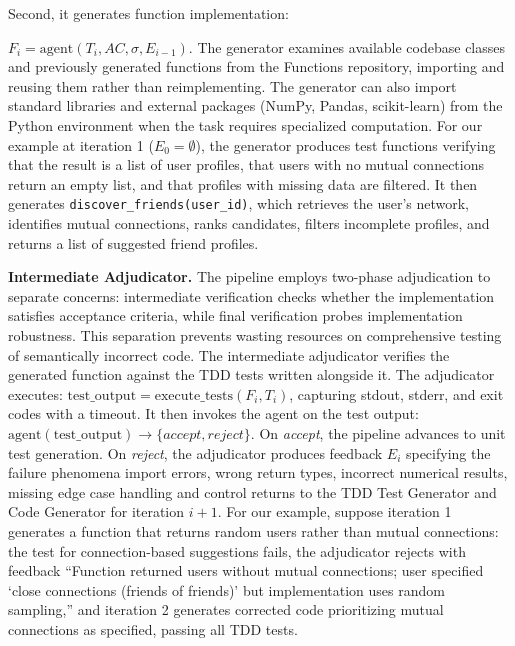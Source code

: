 \documentclass[sigconf,screen]{acmart}
\begin{document}
Second, it generates function implementation:  \-

$F_i = \text{agent}(T_i, AC, \sigma, E_{i-1})$. The generator examines available codebase classes and previously generated functions from the Functions repository, importing and reusing them rather than reimplementing. The generator can also import standard libraries and external packages (NumPy, Pandas, scikit-learn) from the Python environment when the task requires specialized computation. For our example at iteration 1 ($E_0 = \emptyset$), the generator produces test functions verifying that the result is a list of user profiles, that users with no mutual connections return an empty list, and that profiles with missing data are filtered. It then generates \texttt{discover\_friends(user\_id)}, which retrieves the user's network, identifies mutual connections, ranks candidates, filters incomplete profiles, and returns a list of suggested friend profiles.

\textbf{Intermediate Adjudicator.} The pipeline employs two-phase adjudication to separate concerns: intermediate verification checks whether the implementation satisfies acceptance criteria, while final verification probes implementation robustness. This separation prevents wasting resources on comprehensive testing of semantically incorrect code. The intermediate adjudicator verifies the generated function against the TDD tests written alongside it. The adjudicator executes: $\text{test\_output} = \text{execute\_tests}(F_i, T_i)$, capturing stdout, stderr, and exit codes with a timeout. It then invokes the agent on the test output: $\text{agent}(\text{test\_output}) \rightarrow \{\textit{accept}, \textit{reject}\}$. On \textit{accept}, the pipeline advances to unit test generation. On \textit{reject}, the adjudicator produces feedback $E_i$ specifying the failure phenomena import errors, wrong return types, incorrect numerical results, missing edge case handling and control returns to the TDD Test Generator and Code Generator for iteration $i+1$. For our example, suppose iteration 1 generates a function that returns random users rather than mutual connections: the test for connection-based suggestions fails, the adjudicator rejects with feedback ``Function returned users without mutual connections; user specified `close connections (friends of friends)' but implementation uses random sampling,'' and iteration 2 generates corrected code prioritizing mutual connections as specified, passing all TDD tests.
\end{document}
